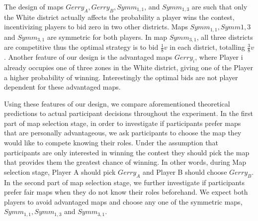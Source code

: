 \documentclass[AER]{AEA}
\begin{document}
The design of maps $Gerry_A, Gerry_B, Symm_{1,1}$, and $Symm_{1,3}$ are such that only the White district actually affects the probability a player wins the contest, incentivizing players to bid zero in two other districts. Maps $Symm_{1,1}, Symm{1,3}$ and $Symm_{3,1}$ are symmetric for both players. In map $Symm_{3,1}$, all three districts are competitive thus the optimal strategy is to bid $\frac{1}{8}v$ in each district, totalling $\frac{3}{8}v$. Another feature of our design is the advantaged maps $Gerry_i$, where Player i already occupies one of three zones in the White district, giving one of the Player a higher probability of winning. Interestingly the optimal bids are not player dependent for these advantaged maps. 
  
Using these features of our design, we compare aforementioned theoretical predictions to actual participant decisions throughout the experiment. In the first part of map selection stage, in order to investigate if participants prefer maps that are personally advantageous, we ask participants to choose the map they would like to compete knowing their roles. Under the assumption that participants are only interested in winning the contest they should pick the map that provides them the greatest chance of winning. In other words, during Map selection stage, Player A should pick $Gerry_A$ and Player B should choose $Gerry_B$. In the second part of map selection stage, we further investigate if participants prefer fair maps when they do not know their roles beforehand. We expect both players to avoid advantaged maps and choose any one of the symmetric maps, $Symm_{1,1}, Symm_{1,3}$ and $Symm_{3,1}$.  
\end{document}
